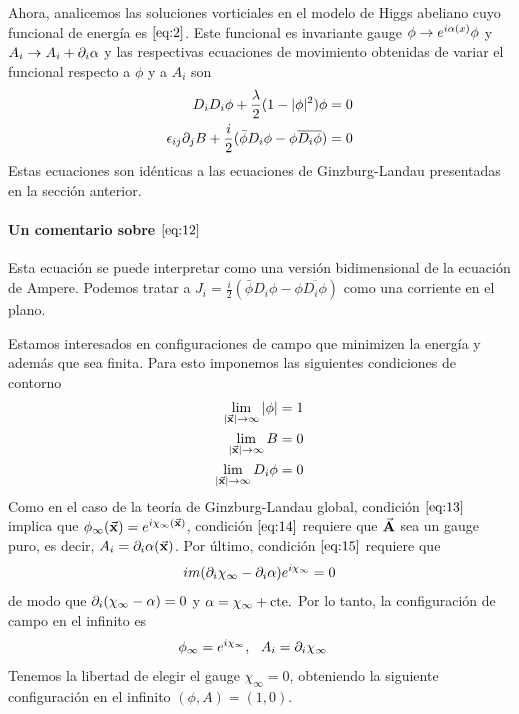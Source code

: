 Ahora, analicemos las soluciones vorticiales en el modelo de Higgs abeliano cuyo funcional de energía es $\eqref{eq:2}$. Este funcional es invariante gauge $\phi\rightarrow e^{i\alpha(x)}\phi$ y $A_i\rightarrow A_i+\partial_i\alpha$ y las respectivas ecuaciones de movimiento obtenidas de variar el funcional respecto a $\phi$ y a $A_i$ son
\begin{align}
    D_iD_i\phi+\frac{\lambda}{2}(1-|\phi|^2)\phi &= 0 \label{eq:11}\\
    \epsilon_{ij}\partial_jB+\frac{i}{2}(\bar\phi D_i\phi-\phi\overline{D_i\phi}) &= 0 \label{eq:12}
\end{align}
Estas ecuaciones son idénticas a las ecuaciones de Ginzburg-Landau presentadas en la sección anterior.

\paragraph{Un comentario sobre $\eqref{eq:12}$} Esta ecuación se puede interpretar como una versión bidimensional de la ecuación de Ampere. Podemos tratar a $J_i=\frac{i}{2}(\bar\phi D_i\phi-\phi\overline{D_i\phi})$ como una corriente en el plano.

Estamos interesados en configuraciones de campo que minimizen la energía y además que sea finita. Para esto imponemos las siguientes condiciones de contorno
\begin{align}
    \lim_{|\vec{\mathbf{x}}|\rightarrow\infty} |\phi| &= 1 \label{eq:13}\\
    \lim_{|\vec{\mathbf{x}}|\rightarrow\infty} B &= 0 \label{eq:14}\\
    \lim_{|\vec{\mathbf{x}}|\rightarrow\infty} D_i\phi &=0\label{eq:15}
\end{align}
Como en el caso de la teoría de Ginzburg-Landau global, condición $\eqref{eq:13}$ implica que $\phi_\infty(\vec{\mathbf{x}}) = e^{i\chi_\infty(\vec{\mathbf{x}})}$, condición $\eqref{eq:14}$ requiere que $\vec{\mathbf{A}}$ sea un gauge puro, es decir, $A_i=\partial_i\alpha(\vec{\mathbf{x}})$. Por último, condición $\eqref{eq:15}$ requiere que
\begin{align}
    im(\partial_i\chi_\infty-\partial_i\alpha)e^{i\chi_\infty} =0
\end{align}
de modo que $\partial_i(\chi_\infty-\alpha)=0$ y $\alpha=\chi_\infty+\text{cte.}$ Por lo tanto, la configuración de campo en el infinito es
\begin{align}
    \phi_\infty = e^{i\chi_\infty} &,\ \ A_i = \partial_i\chi_\infty \label{eq:16}
\end{align}
Tenemos la libertad de elegir el gauge $\chi_\infty=0$, obteniendo la siguiente configuración en el infinito $(\phi,A) = (1,0)$.

